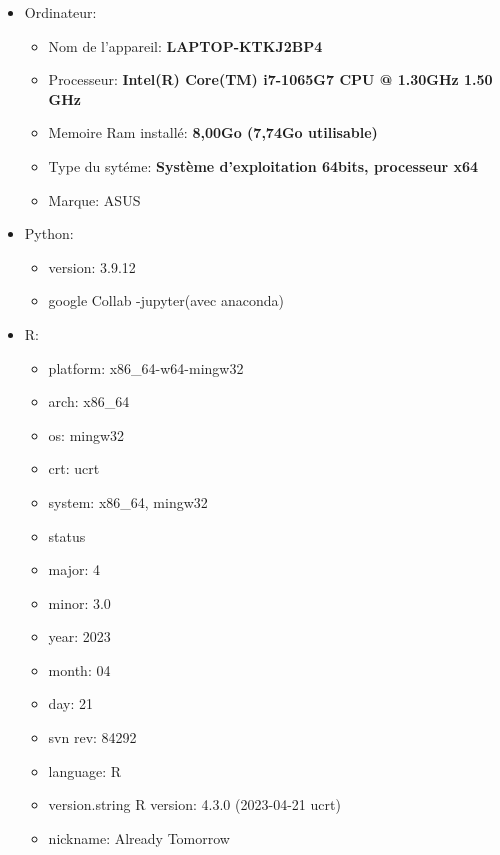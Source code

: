 \documentclass[mstat,12pt]{unswthesis}
\begin{document}
\begin{itemize}
\tightlist
\item
  Ordinateur:

  \begin{itemize}
  \tightlist
  \item
    Nom de l'appareil: \textbf{LAPTOP-KTKJ2BP4}
  \item
    Processeur: \textbf{Intel(R) Core(TM) i7-1065G7 CPU @ 1.30GHz 1.50
    GHz}
  \item
    Memoire Ram installé: \textbf{8,00Go (7,74Go utilisable)}
  \item
    Type du sytéme: \textbf{Système d'exploitation 64bits, processeur
    x64}
  \item
    Marque: ASUS
  \end{itemize}
\item
  Python:

  \begin{itemize}
  \tightlist
  \item
    version: 3.9.12
  \item
    google Collab -jupyter(avec anaconda)
  \end{itemize}
\item
  R:

  \begin{itemize}
  \tightlist
  \item
    platform: x86\_64-w64-mingw32\\
  \item
    arch: x86\_64\\
  \item
    os: mingw32\\
  \item
    crt: ucrt\\
  \item
    system: x86\_64, mingw32\\
  \item
    status\\
  \item
    major: 4\\
  \item
    minor: 3.0\\
  \item
    year: 2023\\
  \item
    month: 04\\
  \item
    day: 21\\
  \item
    svn rev: 84292\\
  \item
    language: R\\
  \item
    version.string R version: 4.3.0 (2023-04-21 ucrt)
  \item
    nickname: Already Tomorrow
  \end{itemize}
\end{itemize}
\end{document}
